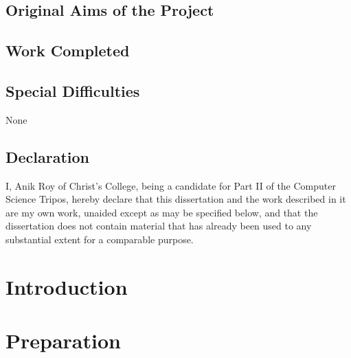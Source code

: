 \documentclass[12pt,twoside,notitlepage,a4paper]{report}
\begin{document}

\section*{Original Aims of the Project}


\section*{Work Completed}


\section*{Special Difficulties}
None

\newpage

\section*{Declaration}

I, Anik Roy of Christ's College, being a candidate for Part II of the Computer
Science Tripos, hereby declare
that this dissertation and the work described in it are my own work,
unaided except as may be specified below, and that the dissertation
does not contain material that has already been used to any substantial
extent for a comparable purpose.

\bigskip
{}

\medskip
{}

\cleardoublepage

\tableofcontents
\listoffigures
\lstlistoflistings


\cleardoublepage        %

\setcounter{page}{1}
\pagestyle{headings}

\chapter{Introduction}

\cleardoublepage

\chapter{Preparation}

\cleardoublepage
\end{document}
